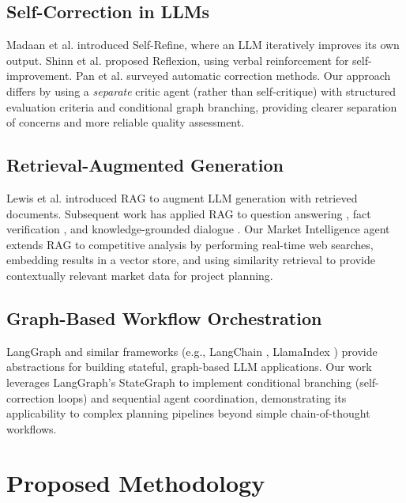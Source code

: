 \documentclass[journal]{IEEEtran}
\begin{document}
\subsection{Self-Correction in LLMs}

Madaan et al. \cite{madaan2023selfrefine} introduced Self-Refine, where an LLM iteratively improves its own output. Shinn et al. \cite{shinn2023reflexion} proposed Reflexion, using verbal reinforcement for self-improvement. Pan et al. \cite{pan2023automatically} surveyed automatic correction methods. Our approach differs by using a \textit{separate} critic agent (rather than self-critique) with structured evaluation criteria and conditional graph branching, providing clearer separation of concerns and more reliable quality assessment.

\subsection{Retrieval-Augmented Generation}

Lewis et al. \cite{lewis2020rag} introduced RAG to augment LLM generation with retrieved documents. Subsequent work has applied RAG to question answering \cite{guu2020realm}, fact verification \cite{thorne2018fever}, and knowledge-grounded dialogue \cite{shuster2021retrieval}. Our Market Intelligence agent extends RAG to competitive analysis by performing real-time web searches, embedding results in a vector store, and using similarity retrieval to provide contextually relevant market data for project planning.

\subsection{Graph-Based Workflow Orchestration}

LangGraph \cite{langgraph2024} and similar frameworks (e.g., LangChain \cite{langchain2023}, LlamaIndex \cite{llamaindex2023}) provide abstractions for building stateful, graph-based LLM applications. Our work leverages LangGraph's StateGraph to implement conditional branching (self-correction loops) and sequential agent coordination, demonstrating its applicability to complex planning pipelines beyond simple chain-of-thought workflows.

\section{Proposed Methodology}
\label{sec:methodology}
\end{document}
